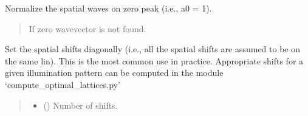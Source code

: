 \documentclass[letterpaper,10pt,english]{sphinxmanual}
\begin{document}
\begin{fulllineitems}
\begin{fulllineitems}
\end{fulllineitems}


\begin{fulllineitems}
\label{\detokenize{source/Illumination:Illumination.Illumination.normalize_spatial_waves}}
\pysigstartsignatures
\pysiglinewithargsret
{}
{}
{}
\pysigstopsignatures
\sphinxAtStartPar
Normalize the spatial waves on zero peak (i.e., a0 = 1).
\begin{quote}\begin{description}
\sphinxAtStartPar
{} \textendash{} If zero wavevector is not found.

\end{description}\end{quote}

\end{fulllineitems}


\begin{fulllineitems}
\label{\detokenize{source/Illumination:Illumination.Illumination.set_spatial_shifts_diagonally}}
\pysigstartsignatures
\pysiglinewithargsret
{}
{\sphinxparamcomma {}}
{}
\pysigstopsignatures
\sphinxAtStartPar
Set the spatial shifts diagonally (i.e., all the spatial shifts are assumed to be on the same lin).
This is the most common use in practice.
Appropriate shifts for a given illumination pattern can be computed in the module ‘compute\_optimal\_lattices.py’
\begin{quote}\begin{description}
\begin{itemize}
\item {} 
\sphinxAtStartPar
{} () \textendash{} Number of shifts.


\end{itemize}
\end{description}
\end{quote}
\end{fulllineitems}
\end{fulllineitems}
\end{document}
